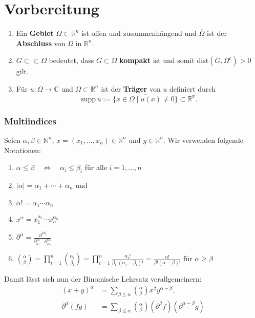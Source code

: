 \documentclass[
paper=a4,
bibtotocnumbered,
liststotocnumbered,
tablecaptionabove,
pointlessnumbers,
twoside,
openright,
10pt
]
{report}
\newcommand{\supp}{\mathrm{supp}\,}
\newcommand{\dist}{\mathrm{dist}}
\theoremstyle{definition}
\numberwithin{equation}{chapter}
\begin{document}
\chapter{Vorbereitung}
\begin{enumerate}[\quad\color{dblue}$\blacktriangleright$]
\item Ein \textbf{Gebiet} $\Omega\subset\mathbb{R}^n$ ist offen und zusammenhängend und $\overline{\Omega}$ ist der \textbf{Abschluss} von $\Omega$ in $\mathbb{R}^n$.
\item $G\subset\subset\Omega$ bedeutet, dass $\overline{G}\subset\Omega$ \textbf{kompakt} ist und somit $\dist(\overline{G},\Omega^c)>0$ gilt.
\item Für $u:\Omega\rightarrow\mathbb{C}$ und $\Omega\subset\mathbb{R}^n$ ist der \textbf{Träger} von $u$ definiert durch
\begin{equation}
\supp u:= \overline{\{x\in\Omega\mid u(x)\neq 0\}}\subset\mathbb{R^n}.
\end{equation}
\end{enumerate}
\subsection*{Multiindices}
Seien $\alpha,\beta\in\mathbb{N}^n$, $x=(x_1,\ldots,x_n)\in\mathbb{R}^n$ und $y\in\mathbb{R}^n$. Wir verwenden folgende Notationen:
\begin{enumerate}[\quad\color{dblue}$\blacktriangleright$]
\item $\alpha\leq\beta\quad\Leftrightarrow\quad \alpha_i\leq\beta_i$ für alle $i=1,\ldots,n$
\item $|\alpha|=\alpha_1+\cdots+\alpha_n$ und 
\item $\alpha! = \alpha_1\cdots\alpha_n$
\item $x^\alpha= x_1^{\alpha_1}\cdots x_n^{\alpha_n}$
\item $\partial^\alpha = \frac{\partial^{|\alpha|}}{\partial_{x_1}^{\alpha_1}\cdots\partial_{x_n}^{\alpha_n}}$
\item $\binom{\alpha}{\beta}=\prod_{i=1}^n \binom{\alpha_i}{\beta_i}=\prod_{i=1}^n \frac{\alpha_i!}{\beta_i!(\alpha_i-\beta_i)!}= \frac{\alpha !}{\beta!(\alpha-\beta
)!}$ für $\alpha\geq\beta$
\end{enumerate}
Damit lässt sich nun der Binomische Lehrsatz verallgemeinern:
\begin{align}
(x+y)^\alpha &= \sum_{\beta\leq\alpha} \binom{\alpha}{\beta} x^\beta y^{\alpha-\beta}, \\
\partial^\alpha (fg) &= \sum_{\beta\leq\alpha} \binom{\alpha}{\beta} (\partial^\beta f)(\partial^{\alpha-\beta}g)
\end{align}
\end{document}
